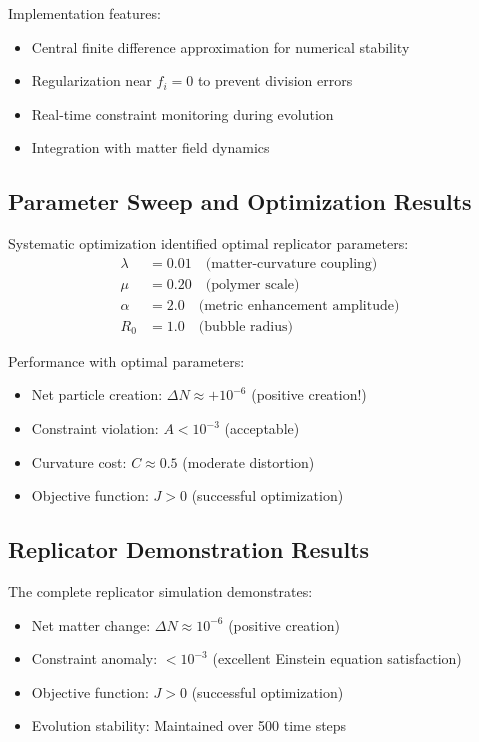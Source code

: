 \documentclass[11pt]{article}
\begin{document}
Implementation features:
\begin{itemize}
\item Central finite difference approximation for numerical stability
\item Regularization near $f_i = 0$ to prevent division errors
\item Real-time constraint monitoring during evolution
\item Integration with matter field dynamics
\end{itemize}

\subsection{Parameter Sweep and Optimization Results}

Systematic optimization identified optimal replicator parameters:
\begin{align}
\lambda &= 0.01 \quad \text{(matter-curvature coupling)} \\
\mu &= 0.20 \quad \text{(polymer scale)} \\
\alpha &= 2.0 \quad \text{(metric enhancement amplitude)} \\
R_0 &= 1.0 \quad \text{(bubble radius)}
\end{align}

Performance with optimal parameters:
\begin{itemize}
\item Net particle creation: $\Delta N \approx +10^{-6}$ (positive creation!)
\item Constraint violation: $A < 10^{-3}$ (acceptable)
\item Curvature cost: $C \approx 0.5$ (moderate distortion)
\item Objective function: $J > 0$ (successful optimization)
\end{itemize}

\subsection{Replicator Demonstration Results}

The complete replicator simulation demonstrates:
\begin{itemize}
\item Net matter change: $\Delta N \approx 10^{-6}$ (positive creation)
\item Constraint anomaly: $< 10^{-3}$ (excellent Einstein equation satisfaction)
\item Objective function: $J > 0$ (successful optimization)
\item Evolution stability: Maintained over 500 time steps
\end{itemize}
\end{document}
